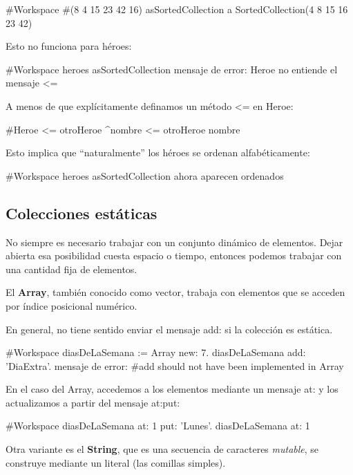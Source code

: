 \documentclass[a4paper,12pt]{book}
\begin{document}
\begin{code}
#Workspace
#(8 4 15 23 42 16) asSortedCollection 
  a SortedCollection(4 8 15 16 23 42)
\end{code}

Esto no funciona para héroes:

\begin{code}
#Workspace
heroes asSortedCollection
  {mensaje de error: Heroe no entiende el mensaje <=}
\end{code}

A menos de que explícitamente definamos un método \textless= en Heroe:

\begin{code}
#Heroe
<= otroHeroe
   ^nombre <= otroHeroe nombre
\end{code}

Esto implica que ``naturalmente'' los héroes se ordenan alfabéticamente:

\begin{code}
#Workspace
heroes asSortedCollection
  {ahora aparecen ordenados}
\end{code}


\subsection{Colecciones estáticas}

No siempre es necesario trabajar con un conjunto dinámico de elementos. Dejar abierta esa posibilidad cuesta
espacio o tiempo, entonces podemos trabajar con una cantidad fija de elementos.

El \textbf{Array}, también conocido como vector, trabaja con elementos que se acceden por índice posicional
numérico.

En general, no tiene sentido enviar el mensaje add: si la colección es estática.

\begin{code}
#Workspace
diasDeLaSemana := Array new: 7.
diasDeLaSemana add: 'DiaExtra'.   
{mensaje de error: #add should not have been implemented in Array}
\end{code}

En el caso del Array, accedemos a los elementos mediante un mensaje at: y los actualizamos a partir del mensaje
at:put:

\begin{code}
#Workspace
diasDeLaSemana at: 1 put: 'Lunes'.
diasDeLaSemana at: 1
\end{code}

Otra variante es el \textbf{String}, que es una secuencia de caracteres \textit{mutable}, se construye
mediante un literal (las comillas simples).
\end{document}

